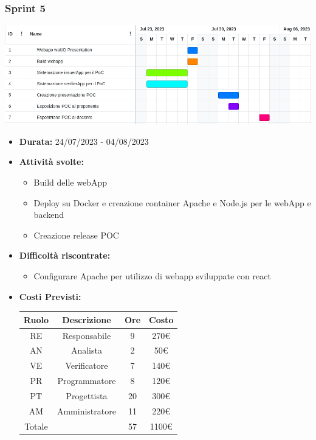     \subsubsection{Sprint 5}
\begin{center}
    \includegraphics[scale = 0.5]{./res/img/Sprint 5.png}
  \end{center}
\begin{itemize}
    \item \textbf{Durata:} 24/07/2023 - 04/08/2023 
    \item \textbf{Attività svolte:}
    \begin{itemize}
        \item Build delle webApp
        \item Deploy su Docker e creazione container Apache e Node.js per le webApp e backend
        \item Creazione release POC 
    \end{itemize}
    \item \textbf{Difficoltà riscontrate:}
    \begin{itemize}
        \item Configurare Apache per utilizzo di webapp sviluppate con react
    \end{itemize}
    \item \textbf{Costi Previsti:}
    \begin{longtable}{|c|c|c|c|}
        \hline
        Ruolo & Descrizione & Ore & Costo \\
        \hline
        RE & Responsabile & 9 &  270€\\
        \hline
        AN & Analista & 2 &  50€\\
        \hline
        VE & Verificatore &  7 &  140€\\
        \hline
        PR & Programmatore & 8 &  120€\\
        \hline
        PT & Progettista & 20 &  300€\\
        \hline
        AM & Amministratore & 11 & 220€ \\
        \hline
        Totale & &  57&  1100€\\

\end{longtable}
\end{itemize}
